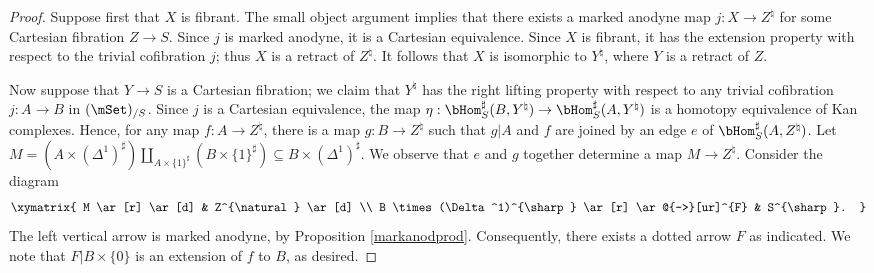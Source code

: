 \begin{proof}
Suppose first that $X$ is fibrant. The small object argument implies that there exists a marked anodyne map $j: X \rightarrow Z^{\natural}$ for some Cartesian fibration $Z \rightarrow S$. Since $j$ is marked anodyne, it is a Cartesian equivalence. Since $X$ is fibrant, it has the extension property with respect to the trivial cofibration $j$; thus $X$ is a retract of $Z^{\natural}$. It follows that $X$ is isomorphic to $Y^{\natural}$, where $Y$ is a retract of $Z$.

Now suppose that $Y \rightarrow S$ is a Cartesian fibration; we claim that $Y^{\natural}$ has
the right lifting property with respect to any trivial cofibration $j: A \rightarrow B$ in $(\mSet)_{/S}$.
Since $j$ is a Cartesian equivalence, the map $\eta: \bHom_{S}^{\sharp}(B,Y^{\natural}) \rightarrow
\bHom_{S}^{\sharp}(A, Y^{\natural})$ is a homotopy equivalence of Kan complexes.
Hence, for any map $f: A \rightarrow Z^{\natural}$, there is a map $g: B \rightarrow Z^{\natural}$
such that $g|A$ and $f$ are joined by an edge $e$ of $\bHom_{S}^{\sharp}(A,Z^{\natural})$.
Let $M = (A \times (\Delta^1)^{\sharp}) \coprod_{ A \times \{1\}^{\sharp} } (B \times \{1\}^{\sharp})
\subseteq B \times (\Delta^1)^{\sharp}$. We observe that $e$ and $g$ together determine a map $M \rightarrow Z^{\natural}$. Consider the diagram
$$ \xymatrix{ M \ar[r] \ar[d] & Z^{\natural} \ar[d] \\
B \times (\Delta^1)^{\sharp} \ar[r] \ar@{-->}[ur]^{F} & S^{\sharp}. }$$
The left vertical arrow is marked anodyne, by Proposition \ref{markanodprod}. Consequently, there exists a dotted arrow $F$ as indicated. We note that $F|B \times \{0\}$ is an extension
of $f$ to $B$, as desired.
\end{proof}



